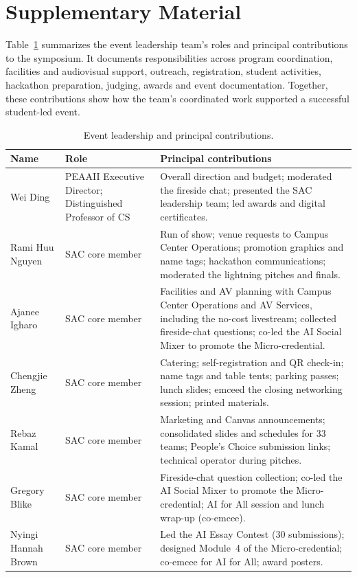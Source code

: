\documentclass[sigconf,nonacm]{acmart}
\begin{document}
\section{Supplementary Material}
\label{app:leadership}
Table~\ref{tab:leadership} summarizes the event leadership team’s roles and principal contributions to the symposium. It documents responsibilities across program coordination, facilities and audiovisual support, outreach, registration, student activities, hackathon preparation, judging, awards and event documentation. Together, these contributions show how the team’s coordinated work supported a successful student-led event.
\begin{table}[htbp]
  \centering
  \caption{Event leadership and principal contributions.}
  \label{tab:leadership}
  \small
  \begin{tabularx}{\textwidth}{@{}p{3.3cm}p{4.2cm}X@{}}
    \toprule
    \textbf{Name} & \textbf{Role} & \textbf{Principal contributions} \\
    \midrule
    Wei Ding & PEAAII Executive Director; Distinguished Professor of CS & Overall direction and budget; moderated the fireside chat; presented the SAC leadership team; led awards and digital certificates. \\
    Rami Huu Nguyen & SAC core member & Run of show; venue requests to Campus Center Operations; promotion graphics and name tags; hackathon communications; moderated the lightning pitches and finals. \\
    Ajanee Igharo & SAC core member & Facilities and AV planning with Campus Center Operations and AV Services, including the no-cost livestream; collected fireside-chat questions; co-led the AI Social Mixer to promote the Micro-credential. \\
    Chengjie Zheng & SAC core member & Catering; self-registration and QR check-in; name tags and table tents; parking passes; lunch slides; emceed the closing networking session; printed materials. \\
    Rebaz Kamal & SAC core member & Marketing and Canvas announcements; consolidated slides and schedules for 33 teams; People's Choice submission links; technical operator during pitches. \\
    Gregory Blike & SAC core member & Fireside-chat question collection; co-led the AI Social Mixer to promote the Micro-credential; AI for All session and lunch wrap-up (co-emcee). \\
    Nyingi Hannah Brown & SAC core member & Led the AI Essay Contest (30 submissions); designed Module~4 of the Micro-credential; co-emcee for AI for All; award posters. \\

\end{tabularx}
\end{table}
\end{document}
